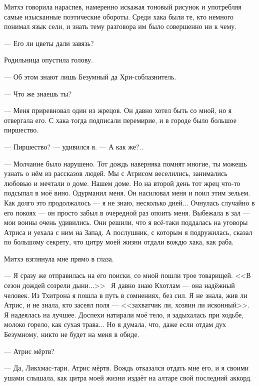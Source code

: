 Митхэ говорила нараспев, намеренно искажая тоновый рисунок и употребляя самые изысканные поэтические обороты.
Среди хака были те, кто немного понимал язык сели, и знать тему разговора им было совершенно ни к чему.

--- Его ли цветы дали завязь?

Родильница опустила голову.

--- Об этом знают лишь Безумный да Хри-соблазнитель.

--- Что же знаешь ты?

--- Меня приревновал один из жрецов.
Он давно хотел быть со мной, но я отвергала его.
С хака тогда подписали перемирие, и в городе было большое пиршество.

--- Пиршество? --- удивился я.
--- А как же?..

--- Молчание было нарушено.
Тот дождь наверняка помнят многие, ты можешь узнать о нём из рассказов людей.
Мы с Атрисом веселились, занимались любовью и мечтали о доме.
Нашем доме.
Но на второй день тот жрец что-то подсыпал в моё вино.
Одурманил меня.
Он насиловал меня и поил этим зельем.
Как долго это продолжалось --- я не знаю, несколько дней...
Очнулась случайно в его покоях --- он просто забыл в очередной раз опоить меня.
Выбежала в зал --- мои воины очень удивились.
Они решили, что я всё-таки поддалась на уговоры Атриса и уехала с ним на Запад.
А послушник, с которым я подружилась, сказал по большому секрету, что цитру моей жизни отдали вождю хака, как раба.

Митхэ взглянула мне прямо в глаза.

--- Я сразу же отправилась на его поиски, со мной пошли трое товарищей.
<<В сезон дождей созрели дыни...>>\FM\
Я давно знаю Кхотлам --- она надёжный человек.
Из Тхитрона я пошла в путь в сомнениях, без сил.
Я не знала, жив ли Атрис, и не знала, кто засеял поля --- <<захватчик ли, хозяин ли исконный>>\FM.
Я надеялась на лучшее.
Доспехи натирали моё тело, я задыхалась при ходьбе, молоко горело, как сухая трава...
Но я думала, что, даже если отдам дух Безумному, никто не будет на меня в обиде.

--- Атрис мёртв?

--- Да, Ликхмас-тари.
Атрис мёртв.
Вождь отказался отдать мне его, и я своими ушами слышала, как цитра моей жизни издаёт на алтаре свой последний аккорд.

